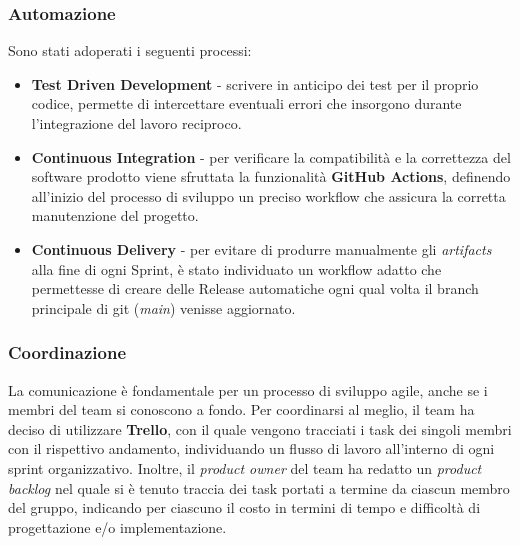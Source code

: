 \subsubsection{Automazione}
Sono stati adoperati i seguenti processi:
\begin{itemize}
    \item \textbf{Test Driven Development} - scrivere in anticipo dei test per il proprio codice, permette di intercettare eventuali errori che insorgono durante l'integrazione del lavoro reciproco.
    \item \textbf{Continuous Integration} - per verificare la compatibilità e la correttezza del software prodotto viene sfruttata la funzionalità \textbf{GitHub Actions}, definendo all'inizio del processo di sviluppo un preciso workflow che assicura la corretta manutenzione del progetto.
    \item \textbf{Continuous Delivery} - per evitare di produrre manualmente gli \textit{artifacts} alla fine di ogni Sprint, è stato individuato un workflow adatto che permettesse di creare delle Release automatiche ogni qual volta il branch principale di git (\textit{main}) venisse aggiornato.
\end{itemize}

\subsubsection{Coordinazione}
La comunicazione è fondamentale per un processo di sviluppo agile, anche se i membri del team si conoscono a fondo. Per coordinarsi al meglio, il team ha deciso di utilizzare \textbf{Trello}, con il quale vengono tracciati i task dei singoli membri con il rispettivo andamento, individuando un flusso di lavoro all'interno di ogni sprint organizzativo. Inoltre, il \textit{product owner} del team ha redatto un \textit{product backlog} nel quale si è tenuto traccia dei task portati a termine da ciascun membro del gruppo, indicando per ciascuno il costo in termini di tempo e difficoltà di progettazione e/o implementazione.
